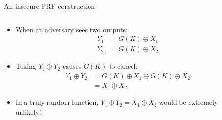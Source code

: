\documentclass[aspectratio=169, lualatex, handout]{beamer}
\begin{document}
\begin{frame}{An insecure PRF construction}
	\begin{columns}[c]
		\begin{column}{0.6\textwidth}
			\begin{itemize}
				\item When an adversary sees two outputs:
				      \begin{align*}
					      Y_1 & = G(K) \oplus X_1 \\
					      Y_2 & = G(K) \oplus X_2
				      \end{align*}
				\item Taking $Y_1 \oplus Y_2$ causes $G(K)$ to cancel:
				      \begin{align*}
					      Y_1 \oplus Y_2 & = G(K) \oplus X_1 \oplus G(K) \oplus X_2 \\
					                     & = X_1 \oplus X_2
				      \end{align*}
				\item In a truly random function, $Y_1 \oplus Y_2 = X_1 \oplus X_2$ would be extremely unlikely!
			\end{itemize}
		\end{column}
		\begin{column}{0.4\textwidth}
			\begin{center}
			\end{center}
		\end{column}
	\end{columns}
\end{frame}
\end{document}
